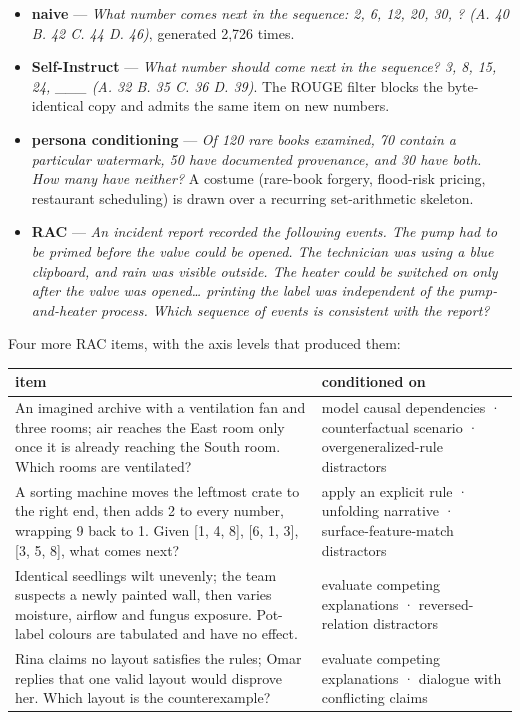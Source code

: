 \documentclass[
  10pt,
]{article}
\providecommand{\tightlist}{%
  \setlength{\itemsep}{0pt}\setlength{\parskip}{0pt}}
\theoremstyle{plain}
\theoremstyle{definition}
\providecommand{\tightlist}{\setlength{\itemsep}{0pt}\setlength{\parskip}{0pt}}
\begin{document}
\begin{itemize}
\tightlist
\item
  \textbf{naive} --- \emph{What number comes next in the sequence: 2, 6,
  12, 20, 30, ? (A. 40 B. 42 C. 44 D. 46)}, generated 2,726 times.
\item
  \textbf{Self-Instruct} --- \emph{What number should come next in the
  sequence? 3, 8, 15, 24, \_\_\_ (A. 32 B. 35 C. 36 D. 39)}. The ROUGE
  filter blocks the byte-identical copy and admits the same item on new
  numbers.
\item
  \textbf{persona conditioning} --- \emph{Of 120 rare books examined, 70
  contain a particular watermark, 50 have documented provenance, and 30
  have both. How many have neither?} A costume (rare-book forgery,
  flood-risk pricing, restaurant scheduling) is drawn over a recurring
  set-arithmetic skeleton.
\item
  \textbf{RAC} --- \emph{An incident report recorded the following
  events. The pump had to be primed before the valve could be opened.
  The technician was using a blue clipboard, and rain was visible
  outside. The heater could be switched on only after the valve was
  opened\ldots{} printing the label was independent of the
  pump-and-heater process. Which sequence of events is consistent with
  the report?}
\end{itemize}

Four more RAC items, with the axis levels that produced them:

{\footnotesize
\begin{longtable}[]{@{}>{\raggedright\arraybackslash}p{}>{\raggedright\arraybackslash}p{}@{}}
\toprule\noalign{}
item & conditioned on \\
\midrule\noalign{}
\endhead
\bottomrule\noalign{}
\endlastfoot
An imagined archive with a ventilation fan and three rooms; air reaches
the East room only once it is already reaching the South room. Which
rooms are ventilated? & model causal dependencies · counterfactual
scenario · overgeneralized-rule distractors \\
A sorting machine moves the leftmost crate to the right end, then adds 2
to every number, wrapping 9 back to 1. Given {[}1, 4, 8{]}, {[}6, 1,
3{]}, {[}3, 5, 8{]}, what comes next? & apply an explicit rule ·
unfolding narrative · surface-feature-match distractors \\
Identical seedlings wilt unevenly; the team suspects a newly painted
wall, then varies moisture, airflow and fungus exposure. Pot-label
colours are tabulated and have no effect. & evaluate competing
explanations · reversed-relation distractors \\
Rina claims no layout satisfies the rules; Omar replies that one valid
layout would disprove her. Which layout is the counterexample? &
evaluate competing explanations · dialogue with conflicting claims \\
\end{longtable}}
\end{document}
